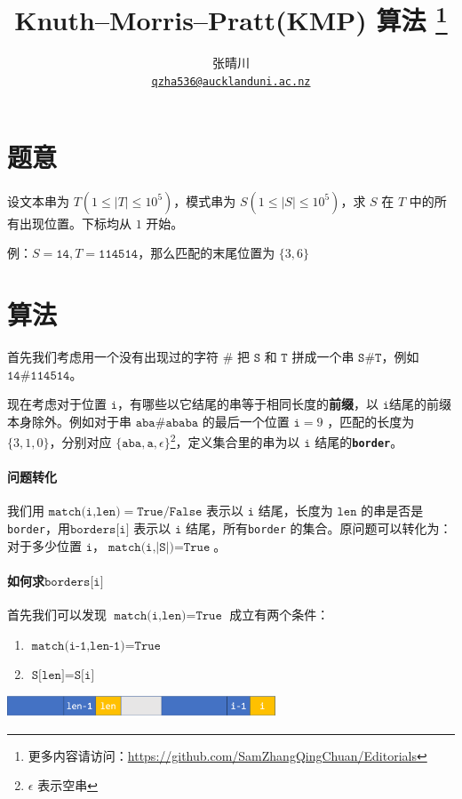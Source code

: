\documentclass{article}
\title{Knuth–Morris–Pratt(KMP) 算法 \footnote{更多内容请访问：\url{https://github.com/SamZhangQingChuan/Editorials}}}
\author{张晴川\\\href{mailto:qzha536@aucklanduni.ac.nz}{\texttt{qzha536@aucklanduni.ac.nz}}}
\begin{document}
\maketitle

\section{题意}
设文本串为 $T(1\le |T| \le 10^5)$，模式串为 $S(1\le |S| \le 10^5)$，求 $S$ 在 $T$ 中的所有出现位置。下标均从 $1$ 开始。

例：$S = \texttt{14},T = \texttt{114514}$，那么匹配的末尾位置为 $\{3,6\}$


\section{算法}
首先我们考虑用一个没有出现过的字符 $\texttt{\#}$ 把 $\texttt{S}$ 和 $\texttt{T}$ 拼成一个串 $\texttt{S\#T}$，例如 $\texttt{14\#114514}$。

现在考虑对于位置 $\texttt{i}$，有哪些以它结尾的串等于相同长度的\textbf{前缀}，以 $\texttt{i}$结尾的前缀本身除外。例如对于串 $\texttt{aba\#ababa}$ 的最后一个位置 $\texttt{i} = 9$ ，匹配的长度为$\{3,1,0\}$，分别对应 $\{\texttt{aba},\texttt{a},\epsilon\}$\footnote{$\epsilon$ 表示空串}，定义集合里的串为以 $\texttt{i}$ 结尾的\textbf{\texttt{border}}。
 
\paragraph{问题转化} 我们用 $\texttt{match(i,len)} = \texttt{True}/\texttt{False}$ 表示以 $\texttt{i}$ 结尾，长度为 $\texttt{len}$ 的串是否是 \texttt{border}，用$\texttt{borders[i]}$ 表示以 $\texttt{i}$ 结尾，所有\texttt{border} 的集合。原问题可以转化为：对于多少位置 $\texttt{i}$，$\texttt{match(i,|S|)} = \texttt{True}$。

\dotfill     

\paragraph{如何求$\texttt{borders[i]}$} 首先我们可以发现 $\texttt{match(i,len)} = \texttt{True}$ 成立有两个条件：
\begin{enumerate}
\item $\texttt{match(i-1,len-1)} = \texttt{True}$
\item $\texttt{S[len]} = \texttt{S[i]}$
\end{enumerate}
\begin{center}
\includegraphics[width=8cm]{1.png}
\end{center}
\end{document}
